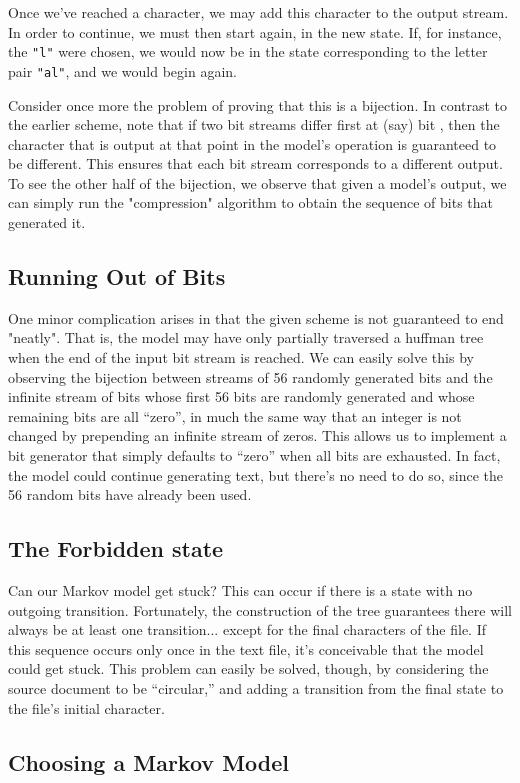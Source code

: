 \documentclass[preprint]{soups}
\newcommand{\Scribtexttt}[1]{{\texttt{#1}}}
\let\SOriginalthesubsubsection\thesubsubsection
\newcommand{\Ssubsection}[2]{\subsection[#1]{#2}\let\thesubsubsection\SOriginalthesubsubsection}
\begin{document}
Once we{'}ve reached a character, we may add this character to
the output stream. In order to continue, we must then start
again, in the new state.  If, for instance, the \Scribtexttt{"l"}
were chosen, we would now be in the state corresponding to
the letter pair \Scribtexttt{"al"}, and we would begin again.

Consider once more the problem of proving that this is a
bijection. In contrast to the earlier scheme, note that if
two bit streams differ first at (say) bit , then the
character that is output at that point in the model{'}s
operation is guaranteed to be different. This ensures that
each bit stream corresponds to a different output. To see
the other half of the bijection, we observe that given a
model{'}s output, we can simply run the "compression"
algorithm to obtain the sequence of bits that generated it.

\Ssubsection{Running Out of Bits}{Running Out of Bits}\label{t:x28part_x22Runningx5fOutx5fofx5fBitsx22x29}

One minor complication arises in that the given scheme is
not guaranteed to end "neatly". That is, the model may have
only partially traversed a huffman tree when the end of the
input bit stream is reached. We can easily solve this by
observing the bijection between streams of 56 randomly
generated bits and the infinite stream of bits whose first
56 bits are randomly generated and whose remaining bits are
all {``}zero{''}, in much the same way that an integer is not
changed by prepending an infinite stream of zeros. This
allows us to implement a bit generator that simply defaults
to {``}zero{''} when all bits are exhausted. In fact, the model
could continue generating text, but there{'}s no need to do
so, since the 56 random bits have already been used.

\Ssubsection{The Forbidden state}{The Forbidden state}\label{t:x28part_x22Thex5fForbiddenx5fstatex22x29}

Can our Markov model get stuck? This can occur if there is a
state with no outgoing transition. Fortunately, the
construction of the tree guarantees there will always be at
least one transition... except for the final characters
of the file. If this sequence occurs only once in the text
file, it{'}s conceivable that the model could get stuck. This
problem can easily be solved, though, by considering the source
document to be {``}circular,{''} and adding a transition from the
final state to the file{'}s initial character.

\Ssubsection{Choosing a Markov Model}{Choosing a Markov Model}\label{t:x28part_x22Choosingx5fax5fMarkovx5fModelx22x29}
\end{document}
